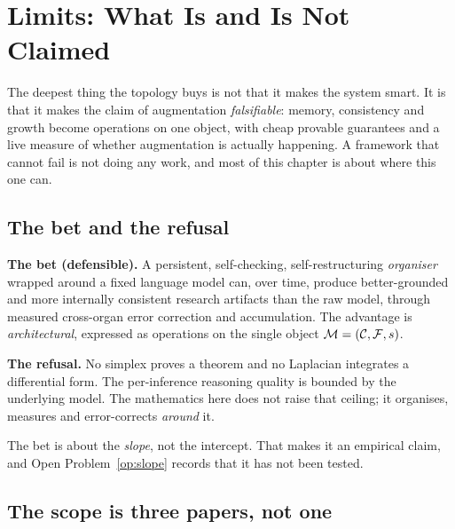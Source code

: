 \chapter{Limits: What Is and Is Not Claimed}\label{ch:limits}

\begin{intu}\Intu
The deepest thing the topology buys is not that it makes the system
smart. It is that it makes the claim of augmentation \emph{falsifiable}:
memory, consistency and growth become operations on one object, with
cheap provable guarantees and a live measure of whether augmentation is
actually happening. A framework that cannot fail is not doing any work,
and most of this chapter is about where this one can.
\end{intu}

\section{The bet and the refusal}

\begin{hon}\Hon
\textbf{The bet (defensible).} A persistent, self-checking,
self-restructuring \emph{organiser} wrapped around a fixed language
model can, over time, produce better-grounded and more internally
consistent research artifacts than the raw model, through measured
cross-organ error correction and accumulation. The advantage is
\emph{architectural}, expressed as operations on the single object
$\mathcal{M}=(\mathcal{C},\mathcal{F},s)$.

\textbf{The refusal.} No simplex proves a theorem and no Laplacian
integrates a differential form. The per-inference reasoning quality is
bounded by the underlying model. The mathematics here does not raise
that ceiling; it organises, measures and error-corrects \emph{around}
it.
\end{hon}

The bet is about the \emph{slope}, not the intercept. That makes it an
empirical claim, and Open Problem~\ref{op:slope} records that it has not
been tested.

\section{The scope is three papers, not one}

